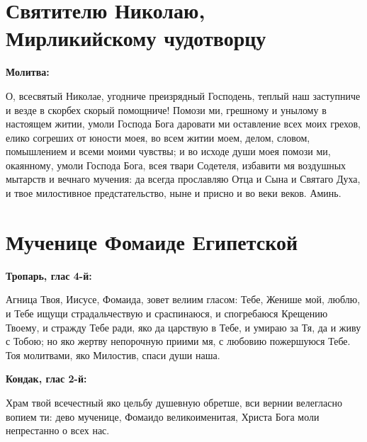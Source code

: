  



\section{Святителю Николаю, Мирликийскому чудотворцу}
 
\bfseries Молитва:\normalfont{}


О, всесвятый Николае, угодниче преизрядный Господень, теплый наш заступниче и везде в скорбех скорый помощниче! Помози ми, грешному и унылому в настоящем житии, умоли Господа Бога даровати ми оставление всех моих грехов, елико согреших от юности моея, во всем житии моем, делом, словом, помышлением и всеми моими чувствы; и во исходе души моея помози ми, окаянному, умоли Господа Бога, всея твари Содетеля, избавити мя воздушных мытарств и вечнаго мучения: да всегда прославляю Отца и Сына и Святаго Духа, и твое милостивное предстательство, ныне и присно и во веки веков. Аминь. 

 



\bigskip\bigskip\mychapterending


 

\section{Мученице Фомаиде Египетской}
 
\bfseries Тропарь, глас 4-й:\normalfont{}

 Агница Твоя, Иисусе, Фомаида, зовет велиим гласом: Тебе, Женише мой, люблю, и Тебе ищущи страдальчествую и сраспинаюся, и спогребаюся Крещению Твоему, и стражду Тебе ради, яко да царствую в Тебе, и умираю за Тя, да и живу с Тобою; но яко жертву непорочную приими мя, с любовию пожершуюся Тебе. Тоя молитвами, яко Милостив, спаси души наша.





\bfseries Кондак, глас 2-й:\normalfont{}

 Храм твой всечестный яко цельбу душевную обретше, вси вернии велегласно вопием ти: дево мученице, Фомаидо великоименитая, Христа Бога моли непрестанно о всех нас.





